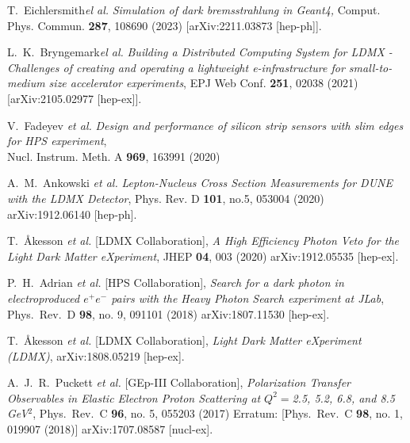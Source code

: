 \documentclass[11pt]{article}
\begin{document}
    \begin{thebibliography}{99}

        T.~Eichlersmith{\it el al.}
        \emph{Simulation of dark bremsstrahlung in Geant4,}
        Comput. Phys. Commun. \textbf{287}, 108690 (2023)
        [arXiv:2211.03873 [hep-ph]].

        L.~K.~Bryngemark{\it el al.}
        \emph{Building a Distributed Computing System for LDMX - Challenges of creating and operating a lightweight e-infrastructure for small-to-medium size accelerator experiments},
        EPJ Web Conf. \textbf{251}, 02038 (2021)
        [arXiv:2105.02977 [hep-ex]].

        V.~Fadeyev {\it et al.} 
        \emph{Design and performance of silicon strip sensors with slim edges for HPS experiment},
        \\ Nucl. Instrum. Meth. A \textbf{969}, 163991 (2020)
    
        A.~M.~Ankowski {\it et al.}
        \emph{Lepton-Nucleus Cross Section Measurements for DUNE with the LDMX Detector},
        Phys. Rev. D \textbf{101}, no.5, 053004 (2020)  
        arXiv:1912.06140 [hep-ph].

        T.~Åkesson {\it et al.} [LDMX Collaboration],
        \emph{A High Efficiency Photon Veto for the Light Dark Matter eXperiment},
        JHEP \textbf{04}, 003 (2020)
        arXiv:1912.05535 [hep-ex].

         P.~H.~Adrian {\it et al.} [HPS Collaboration],
         \emph{Search for a dark photon in electroproduced $e^{+}e^{-}$ pairs with the Heavy Photon Search experiment at JLab},
         Phys.\ Rev.\ D {\bf 98}, no. 9, 091101 (2018)
         arXiv:1807.11530 [hep-ex].
        
         T.~Åkesson {\it et al.} [LDMX Collaboration],
         \emph{Light Dark Matter eXperiment (LDMX)},
            arXiv:1808.05219 [hep-ex].

         A.~J.~R.~Puckett {\it et al.} [GEp-III Collaboration],
         \emph{Polarization Transfer Observables in Elastic Electron Proton Scattering at $Q^2 = $2.5, 5.2, 6.8, and 8.5 GeV$^2$},
         Phys.\ Rev.\ C {\bf 96}, no. 5, 055203 (2017)
         Erratum: [Phys.\ Rev.\ C {\bf 98}, no. 1, 019907 (2018)]
         arXiv:1707.08587 [nucl-ex].


\end{thebibliography}
\end{document}
